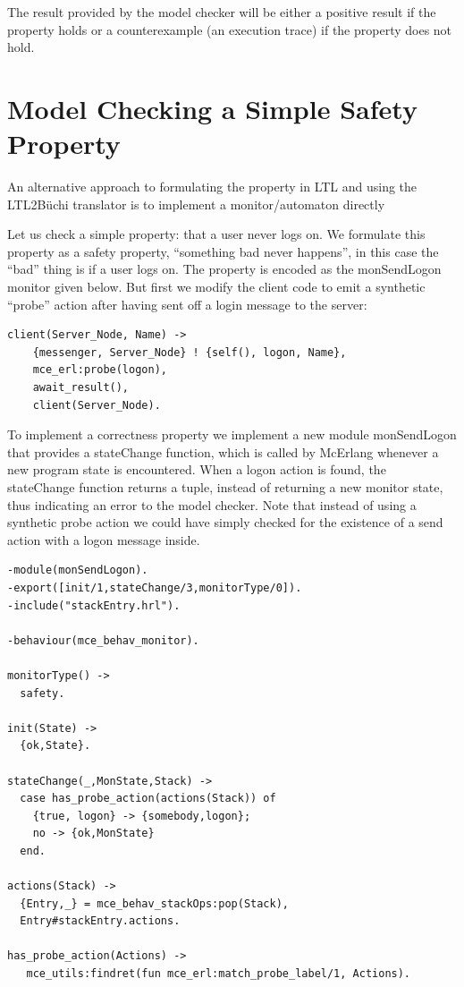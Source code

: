 \documentclass[a4paper]{article}
\newcommand{\logon}{monSendLogon\xspace}
\newcommand{\statechange}{stateChange\xspace}
\begin{document}
The result provided by the model checker will be either a positive
result if the property holds or a counterexample (an execution trace)
if the property does not hold.



\section{Model Checking a Simple Safety Property}

\label{implementingmonitor}


An alternative approach to formulating the property in LTL and using
the LTL2B\"{u}chi translator is to implement a monitor/automaton
directly

Let us check a simple property: that a user never logs on. We
formulate this property as a safety property, ``something bad never
happens'', in this case the ``bad'' thing is if a user logs on. The
property is encoded as the \logon monitor given below. But
first we modify the client code to emit a synthetic
``probe'' action after having sent off a login message to the server:
\begin{verbatim}
client(Server_Node, Name) ->
    {messenger, Server_Node} ! {self(), logon, Name},
    mce_erl:probe(logon),
    await_result(),
    client(Server_Node).
\end{verbatim}
To implement a correctness property we implement a new module \logon
that provides a \statechange function, which is
called by McErlang whenever a new program state is encountered. 
When a logon action is found, the \statechange function returns a tuple, 
instead of returning a new monitor state, thus indicating an error to the
model checker. Note that instead of using a synthetic probe action we could
have simply checked for the existence of a send action with a logon
message inside.

\begin{verbatim}
-module(monSendLogon).
-export([init/1,stateChange/3,monitorType/0]).
-include("stackEntry.hrl").

-behaviour(mce_behav_monitor).

monitorType() ->
  safety.

init(State) ->
  {ok,State}.

stateChange(_,MonState,Stack) ->
  case has_probe_action(actions(Stack)) of
    {true, logon} -> {somebody,logon};
    no -> {ok,MonState}
  end.

actions(Stack) ->
  {Entry,_} = mce_behav_stackOps:pop(Stack),
  Entry#stackEntry.actions.
 
has_probe_action(Actions) ->
   mce_utils:findret(fun mce_erl:match_probe_label/1, Actions).
\end{verbatim}
\end{document}
